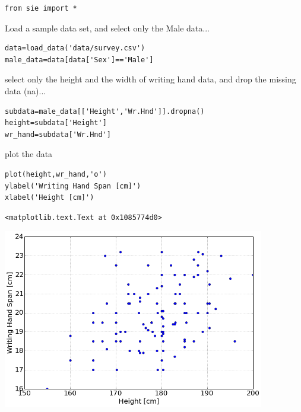 \begin{lstlisting}
from sie import *
\end{lstlisting}

Load a sample data set, and select only the Male data...

\begin{lstlisting}
data=load_data('data/survey.csv')
male_data=data[data['Sex']=='Male']
\end{lstlisting}

select only the height and the width of writing hand data, and drop the missing
data (na)...

\begin{lstlisting}
subdata=male_data[['Height','Wr.Hnd']].dropna()
height=subdata['Height']
wr_hand=subdata['Wr.Hnd']
\end{lstlisting}

plot the data

\begin{lstlisting}
plot(height,wr_hand,'o')
ylabel('Writing Hand Span [cm]')
xlabel('Height [cm]')
\end{lstlisting}

\begin{verbatim}
<matplotlib.text.Text at 0x1085774d0>
\end{verbatim}

\begin{center}\includegraphics[width=4.5in]{Random_Sequences_and_Visualization/Random_Sequences_and_Visualization_fig1.png}\end{center}


